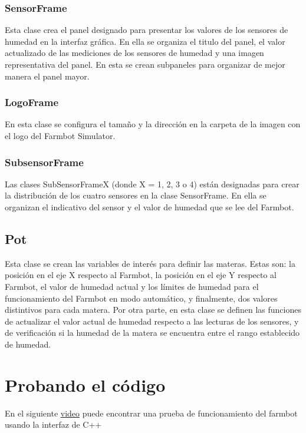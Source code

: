 \documentclass[letterpaper,12pt]{article}
\begin{document}
	\subsubsection{SensorFrame}
	Esta clase crea el panel designado para presentar los valores de los sensores de humedad en la interfaz gráfica. En ella se organiza el titulo del panel, el valor actualizado de las mediciones de los sensores de humedad y una imagen representativa del panel. En esta se crean subpaneles para organizar de mejor manera el panel mayor.
	\subsubsection{LogoFrame}
	En esta clase se configura el tamaño y la dirección en la carpeta de la imagen con el logo del Farmbot Simulator.
	\subsubsection{SubsensorFrame}
	Las clases SubSensorFrameX (donde X = 1, 2, 3 o 4) están designadas para crear la distribución de los cuatro sensores en la clase SensorFrame. En ella se organizan el indicativo del sensor y el valor de humedad que se lee del Farmbot.

	
	
	\subsection{Pot}
	Esta clase se crean las variables de interés para definir las materas. Estas son: la posición en el eje X respecto al Farmbot, la posición en el eje Y respecto al Farmbot, el valor de humedad actual y los límites de humedad para el funcionamiento del Farmbot en modo automático, y finalmente, dos valores distintivos para cada matera. Por otra parte, en esta clase se definen las funciones de actualizar el valor actual de humedad respecto a las lecturas de los sensores, y de verificación si la humedad de la matera se encuentra entre el rango establecido de humedad.

	\section{Probando el código}
	En el siguiente \href{URL}{video} puede encontrar una prueba de funcionamiento del farmbot usando la interfaz de C++ 
\end{document}
